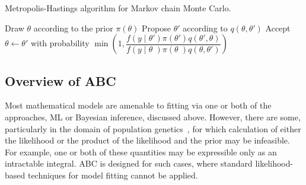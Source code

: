 \begin{algorithm}
  \caption{Metropolis-Hastings algorithm for Markov chain Monte Carlo.}
  \begin{algorithmic}
    \State Draw $\theta$ according to the prior $\pi(\theta)$
    \Loop
      \State Propose $\theta'$ according to $q(\theta, \theta')$
      \State Accept $\theta \gets \theta'$ with probability
      $\min \left( 1, 
       \dfrac{f(y \mid \theta') \pi(\theta') q(\theta', \theta)}
             {f(y \mid \theta\phantom{'}) \pi(\theta\phantom{'}) q(\theta, \theta')}
       \right)$
    \EndLoop
  \end{algorithmic}
  \label{alg:mh}
\end{algorithm}

\subsection{Overview of ABC}
\label{subsec:abcoverview}

Most mathematical models are amenable to fitting via one or both of the
approaches, \gls{ML} or Bayesian inference, discussed above. However, there are
some, particularly in the domain of population
genetics~\autocite{beaumont2002approximate, beaumont2010approximate}, for which
calculation of either the likelihood or the product of the likelihood and the
prior may be infeasible. For example, one or both of these quantities may be
expressible only as an intractable integral. \Gls{ABC} is designed for such
cases, where standard likelihood-based techniques for model fitting cannot be
applied. 

